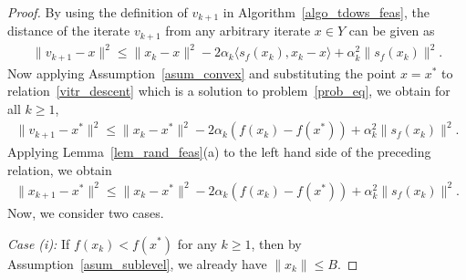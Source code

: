 \documentclass{article}
\def\la{\langle}
\def\ra{\rangle}
\theoremstyle{plain}
\theoremstyle{definition}
\theoremstyle{remark}
\begin{document}
\begin{proof}
    By using the definition of $v_{k+1}$ in Algorithm~\ref{algo_tdows_feas}, the distance of the iterate $v_{k+1}$ from any arbitrary iterate $x \in Y$ can be given as
    \begin{align}
        \|v_{k+1} - x\|^2 \leq \|x_{k} - x\|^2 - 2 \alpha_k \la s_f(x_k), x_k - x \ra + \alpha_k^2 \|s_f(x_k)\|^2 . \label{vitr_descent}
    \end{align}
    Now applying Assumption~\ref{asum_convex} and substituting the point $x = x^*$ to relation~\eqref{vitr_descent} which is a solution to problem~\eqref{prob_eq}, we obtain for all $k \geq 1$,
    \begin{align*}
        \|v_{k+1} - x^*\|^2 \leq \|x_{k} - x^*\|^2 - 2 \alpha_k (f(x_k) - f(x^*)) + \alpha_k^2 \|s_f(x_k)\|^2 .
    \end{align*}
    Applying Lemma~\ref{lem_rand_feas}(a) to the left hand side of the preceding relation, we obtain
    \begin{align}
        \|x_{k+1} - x^*\|^2 \leq \|x_{k} - x^*\|^2 - 2 \alpha_k (f(x_k) - f(x^*)) + \alpha_k^2 \|s_f(x_k)\|^2 . \label{itr_bd_rel1}
    \end{align}
    Now, we consider two cases.

    \noindent\textit{Case (i):} If $f(x_k) < f(x^*)$ for any $k \geq 1$, then by Assumption~\ref{asum_sublevel}, we already have $\|x_k\| \leq B$.
    

\end{proof}
\end{document}
